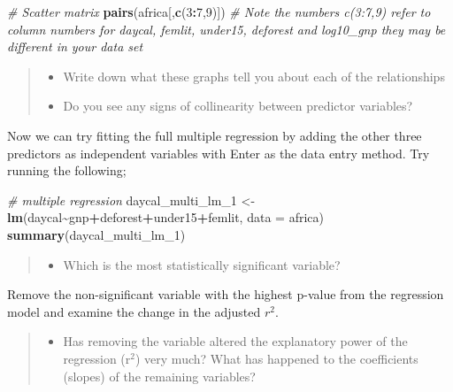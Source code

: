 \documentclass[
]{book}
\newenvironment{Shaded}{\begin{snugshade}}{\end{snugshade}}
\newcommand{\AttributeTok}[1]{\textcolor[rgb]{0.13,0.29,0.53}{#1}}
\newcommand{\CommentTok}[1]{\textcolor[rgb]{0.56,0.35,0.01}{\textit{#1}}}
\newcommand{\DecValTok}[1]{\textcolor[rgb]{0.00,0.00,0.81}{#1}}
\newcommand{\FunctionTok}[1]{\textcolor[rgb]{0.13,0.29,0.53}{\textbf{#1}}}
\newcommand{\NormalTok}[1]{#1}
\newcommand{\OtherTok}[1]{\textcolor[rgb]{0.56,0.35,0.01}{#1}}
\newcommand{\SpecialCharTok}[1]{\textcolor[rgb]{0.81,0.36,0.00}{\textbf{#1}}}
\providecommand{\tightlist}{%
  \setlength{\itemsep}{0pt}\setlength{\parskip}{0pt}}
\begin{document}
\begin{Shaded}
\begin{Highlighting}[]
\CommentTok{\# Scatter matrix}
\FunctionTok{pairs}\NormalTok{(africa[,}\FunctionTok{c}\NormalTok{(}\DecValTok{3}\SpecialCharTok{:}\DecValTok{7}\NormalTok{,}\DecValTok{9}\NormalTok{)])}
\CommentTok{\# Note the numbers c(3:7,9) refer to column numbers for daycal, femlit, under15, deforest and log10\_gnp they may be different in your data set}
\end{Highlighting}
\end{Shaded}

\begin{quote}
\begin{itemize}
\tightlist
\item
  Write down what these graphs tell you about each of the relationships
\item
  Do you see any signs of collinearity between predictor variables?
\end{itemize}
\end{quote}

Now we can try fitting the full multiple regression by adding the other three predictors as independent variables with Enter as the data entry method. Try running the following;

\begin{Shaded}
\begin{Highlighting}[]
\CommentTok{\# multiple regression}
\NormalTok{daycal\_multi\_lm\_1 }\OtherTok{\textless{}{-}} \FunctionTok{lm}\NormalTok{(daycal}\SpecialCharTok{\textasciitilde{}}\NormalTok{gnp}\SpecialCharTok{+}\NormalTok{deforest}\SpecialCharTok{+}\NormalTok{under15}\SpecialCharTok{+}\NormalTok{femlit, }\AttributeTok{data =}\NormalTok{ africa)}
\FunctionTok{summary}\NormalTok{(daycal\_multi\_lm\_1)}
\end{Highlighting}
\end{Shaded}

\begin{quote}
\begin{itemize}
\tightlist
\item
  Which is the most statistically significant variable?
\end{itemize}
\end{quote}

Remove the non-significant variable with the highest p-value from the regression model and examine the change in the adjusted \(r^2\).

\begin{quote}
\begin{itemize}
\tightlist
\item
  Has removing the variable altered the explanatory power of the regression (r\(^2\)) very much? What has happened to the coefficients (slopes) of the remaining variables?
\end{itemize}
\end{quote}
\end{document}
